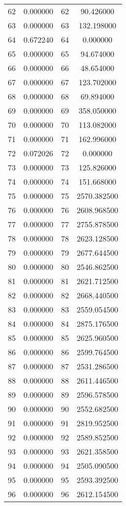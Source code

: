 \documentclass[12pt]{article}
\begin{document}
\begin{longtable}{@{}cccc@{}}
62 & 0.000000 & 62 & 90.426000 \\
63 & 0.000000 & 63 & 132.198000 \\
64 & 0.672240 & 64 & 0.000000 \\
65 & 0.000000 & 65 & 94.674000 \\
66 & 0.000000 & 66 & 48.654000 \\
67 & 0.000000 & 67 & 123.702000 \\
68 & 0.000000 & 68 & 69.894000 \\
69 & 0.000000 & 69 & 358.050000 \\
70 & 0.000000 & 70 & 113.082000 \\
71 & 0.000000 & 71 & 162.996000 \\
72 & 0.072026 & 72 & 0.000000 \\
73 & 0.000000 & 73 & 125.826000 \\
74 & 0.000000 & 74 & 151.668000 \\
75 & 0.000000 & 75 & 2570.382500 \\
76 & 0.000000 & 76 & 2608.968500 \\
77 & 0.000000 & 77 & 2755.878500 \\
78 & 0.000000 & 78 & 2623.128500 \\
79 & 0.000000 & 79 & 2677.644500 \\
80 & 0.000000 & 80 & 2546.862500 \\
81 & 0.000000 & 81 & 2621.712500 \\
82 & 0.000000 & 82 & 2668.440500 \\
83 & 0.000000 & 83 & 2559.054500 \\
84 & 0.000000 & 84 & 2875.176500 \\
85 & 0.000000 & 85 & 2625.960500 \\
86 & 0.000000 & 86 & 2599.764500 \\
87 & 0.000000 & 87 & 2531.286500 \\
88 & 0.000000 & 88 & 2611.446500 \\
89 & 0.000000 & 89 & 2596.578500 \\
90 & 0.000000 & 90 & 2552.682500 \\
91 & 0.000000 & 91 & 2819.952500 \\
92 & 0.000000 & 92 & 2589.852500 \\
93 & 0.000000 & 93 & 2621.358500 \\
94 & 0.000000 & 94 & 2505.090500 \\
95 & 0.000000 & 95 & 2593.392500 \\
96 & 0.000000 & 96 & 2612.154500 \\

\end{longtable}
\end{document}
